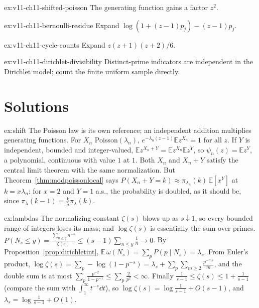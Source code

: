 \begin{hint}{ex:v11-ch11-shifted-poisson}
The generating function gains a factor $z^2$.
\end{hint}

\begin{hint}{ex:v11-ch11-bernoulli-residue}
Expand $\log(1+(z-1)p_j)-(z-1)p_j$.
\end{hint}

\begin{hint}{ex:v11-ch11-cycle-counts}
Expand $z(z+1)(z+2)/6$.
\end{hint}

\begin{hint}{ex:v11-ch11-dirichlet-divisibility}
Distinct-prime indicators are independent in the Dirichlet model; count the finite uniform sample directly.
\end{hint}

\section{Solutions}

\begin{solution}{ex:shift}
\idea The Poisson law is its own reference; an independent addition multiplies generating functions.
\writeup For $X_n$ Poisson$(\lambda_n)$, $e^{-\lambda_n(z-1)}\mathbb Ez^{X_n}=1$ for all $z$. If $Y$ is independent, bounded and integer-valued, $\mathbb Ez^{X_n+Y}=\mathbb Ez^{X_n}\mathbb Ez^Y$, so $\psi_n(z)=\mathbb Ez^Y$, a polynomial, continuous with value $1$ at $1$.
Both $X_n$ and $X_n+Y$ satisfy the central limit theorem with the same normalization. But Theorem~\ref{thm:modpoissonlocal} says $P(X_n+Y=k)\approx\pi_{\lambda_n}(k)\,\mathbb E[x^Y]$ at $k=x\lambda_n$: for $x=2$ and $Y=1$ a.s., the probability is doubled, as it should be,
since $\pi_\lambda(k-1)=\frac k\lambda\pi_\lambda(k)$.
\end{solution}

\begin{solution}{ex:lambdas}
\idea The normalizing constant $\zeta(s)$ blows up as $s\downarrow1$, so every bounded range of integers loses its mass; and $\log\zeta(s)$ is essentially the sum over primes.
\writeup $P(N_s\le y)=\frac{\sum_{n\le y}n^{-s}}{\zeta(s)}\le(s-1)\sum_{n\le y}\frac1n\to0$. By Proposition~\ref{prop:dirichletint}, $\mathbb E\,\omega(N_s)=\sum_pP(p\mid N_s)=\lambda_s$. From Euler's product,
$\log\zeta(s)=\sum_p-\log(1-p^{-s})=\lambda_s+\sum_p\sum_{m\ge2}\frac{p^{-ms}}m$, and the double sum is at most $\sum_p\frac{p^{-2}}{1-p^{-1}}\le\sum_p\frac2{p^2}<\infty$. Finally $\frac1{s-1}\le\zeta(s)\le1+\frac1{s-1}$ (compare the sum with $\int_1^\infty t^{-s}\dd t$),
so $\log\zeta(s)=\log\frac1{s-1}+O(s-1)$, and $\lambda_s=\log\frac1{s-1}+O(1)$.
\end{solution}

